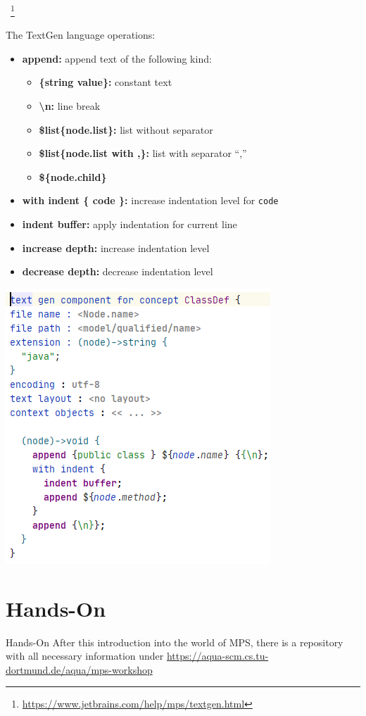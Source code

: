 	\begin{frame}{\workshoptextgen\ \footnote{\url{https://www.jetbrains.com/help/mps/textgen.html}}}
	\begin{minipage}{0.52\textwidth}
		The TextGen language operations:\\
		\begin{itemize}
			\item \textbf{append:} append text of the following kind:
			\begin{itemize}
				\item \textbf{\{string value\}:} constant text
				\item \textbf{\textbackslash n:} line break
				\item \textbf{\$list\{node.list\}:} list without separator
				\item \textbf{\$list\{node.list with ,\}:} list with separator ``,''
				\item \textbf{\$\{node.child\}}
			\end{itemize}
			\item \textbf{with indent \{ code \}:} increase indentation level for \texttt{code}
			\item \textbf{indent buffer:} apply indentation for current line
			\item \textbf{increase depth:} increase indentation level
			\item \textbf{decrease depth:} decrease indentation level
		\end{itemize}
	\end{minipage}
	\begin{minipage}{0.4\textwidth}
		\includegraphics[height=0.9\textheight]{illustrations/textgen.png}
	\end{minipage}
	\end{frame}

	\section{Hands-On}	
	
	\begin{frame}{Hands-On}
		After this introduction into the world of MPS, there is a repository with all necessary information under \url{https://aqua-scm.cs.tu-dortmund.de/aqua/mps-workshop}
	\end{frame}
	

	


